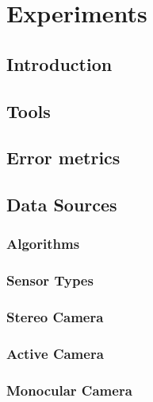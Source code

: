 \makeatletter
\chapter{Experiments}
\label{ch:Experiments}

\section{Introduction}


\section{Tools}
\label{ToolsSection}


\section{Error metrics}
\label{metricsSection}


\section{Data Sources}
\label{Sec:FVRSOTA}
\subsection{Algorithms} 
\label{AlgorithmsSection}


\subsection{Sensor Types} 
\label{SensorTypesExpsSection}


\subsection{Stereo Camera}
\label{StereoSOTA}


\subsection{Active Camera}
\label{ActiveSOTA}


\subsection{Monocular Camera}
\label{Sec:MonocularSOTA}


